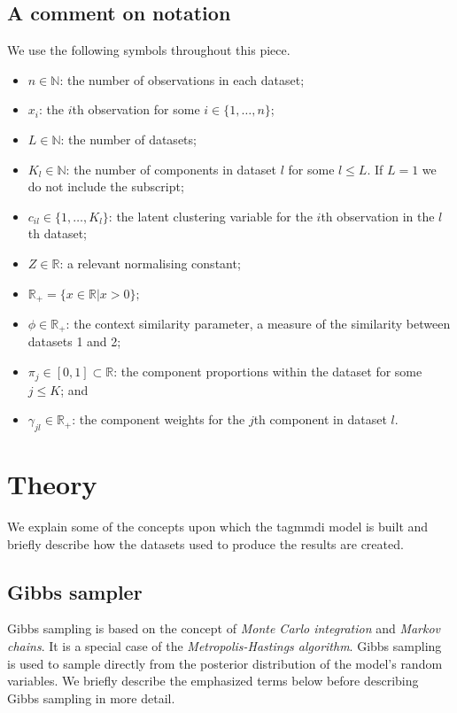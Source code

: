 \documentclass[11pt]{article} %
\begin{document}
\subsection*{A comment on notation}
We use the following symbols throughout this piece.
\begin{itemize}
 \item $n \in \mathbb{N}$: the number of observations in each dataset;
 \item $x_i$: the $i$th observation for some $i \in \{1,\ldots, n\}$;
 \item $L  \in \mathbb{N}$: the number of datasets;
 \item $K_l \in \mathbb{N}$: the number of components in dataset $l$ for some $l \leq L$. If $L = 1$ we do not include the subscript;
 \item $c_{il} \in \{1,\ldots,K_l\}$: the latent clustering variable for the $i$th observation in the $l$th dataset;
 \item $Z \in \mathbb{R}$: a relevant normalising constant;
 \item $\mathbb{R}_+ = \{x \in \mathbb{R} | x > 0\};$
 \item $\phi \in \mathbb{R}_+$: the context similarity parameter, a measure of the similarity between datasets 1 and 2;
 \item $\pi_j \in [0, 1] \subset \mathbb{R}$: the component proportions within the dataset for some $j \leq K$; and
 \item $\gamma_{jl} \in \mathbb{R}_+$: the component weights for the $j$th component in dataset $l$.
\end{itemize}

\section{Theory}
We explain some of the concepts upon which the tagmmdi model is built and briefly describe how the datasets used to produce the results are created.
\subsection{Gibbs sampler}
Gibbs sampling is based on the concept of \emph{Monte Carlo integration} and \emph{Markov chains}. It is a special case of the \emph{Metropolis-Hastings algorithm}. Gibbs sampling is used to sample directly from the posterior distribution of the model's random variables. We briefly describe the emphasized terms below before describing Gibbs sampling in more detail.
\end{document}

